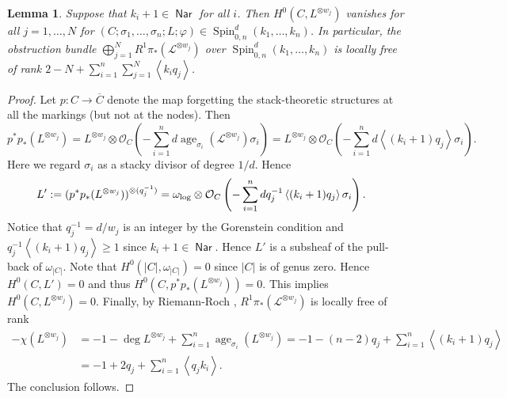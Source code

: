 \documentclass[11pt]{amsart}
\newtheorem{lem}[thm]{Lemma} %
\theoremstyle{definition} %
\theoremstyle{remark} %
\newcommand{\ZZ}{\mathbb Z}
\newcommand{\age}{\operatorname{age}}
\def\ol{\overline}
\def\fracp#1{\left\langle #1 \right\rangle}
\newcommand{\cO}{\mathcal{O}}
\newcommand{\cL}{\mathcal{L}}
\newcommand{\Nar}{\operatorname{\mathsf{Nar}}}
\newcommand{\Spin}{\operatorname{Spin}}
\begin{document}
\begin{lem} \label{lem:concave}
Suppose that $k_i+1 \in \Nar$ for all $i$.
Then $H^0(C,L^{\otimes w_j})$ vanishes for all $j=1,\dots, N$ for  
$(C;\sigma_1,\dots,\sigma_n;L;\varphi)\in 
\Spin^d_{0,n}(k_1,\dots,k_n)$. 
In particular, the obstruction bundle  
$\bigoplus_{j=1}^N R^1\pi_* (\cL^{\otimes w_j})$ 
over $\Spin^d_{0,n}(k_1,\dots,k_n)$ 
is locally free of rank $2 - N + \sum_{i=1}^n \sum_{j=1}^N \fracp{k_i q_j}$. 
\end{lem} 
\begin{proof} 
Let $p\colon C \to \ol{C}$ denote the map forgetting the 
stack-theoretic structures at all the markings 
(but not at the nodes). 
Then 
\[
p^* p_* (L^{\otimes w_j}) = L^{\otimes w_j} \otimes 
\cO_C\left( - \sum_{i=1}^n 
d \age_{\sigma_i} (\cL^{\otimes w_j}) \sigma_i \right) 
= L^{\otimes w_j}\otimes \cO_C\left(
- \sum_{i=1}^n d \fracp{(k_i+1) q_j} \sigma_i \right). 
\]  
Here we regard $\sigma_i$ as a stacky divisor of degree $1/d$. 
Hence 
\begin{align*} 
L' := (p^* p_* (L^{\otimes w_j}))^{\otimes (q_j^{-1})}  
& = \omega_{\rm \log}\otimes \cO_C\left(
-\sum_{i=1}^n d q_j^{-1} \fracp{(k_i+1) q_j}\sigma_i 
\right). 
\end{align*} 
Notice that $q_j^{-1} = d/w_j$ is an integer by the Gorenstein condition 
and $q_j^{-1} \fracp{(k_i+1) q_j} \ge 1$ since $k_i+1 \in \Nar$. 
Hence $L'$ is a subsheaf of the pull-back of $\omega_{|C|}$. 
Note that $H^0(|C|,\omega_{|C|})=0$ since $|C|$ is of genus zero. 
Hence $H^0(C, L')=0$ 
and thus $H^0(C,p^* p_* (L^{\otimes w_j})) =0$. 
This implies $H^0(C, L^{\otimes w_j}) =0$. 
Finally, by Riemann-Roch \cite{AGV, Kawasaki, Toen}, 
$R^1 \pi_* (\cL^{\otimes w_j})$ is locally free of rank 
\begin{align*} 
-\chi(L^{\otimes w_j}) & = 
-1 - \deg L^{\otimes w_j} + \sum_{i=1}^n \age_{\sigma_i}(L^{\otimes w_j}) 
=  
-1 - (n-2)q_j + \sum_{i=1}^n  \fracp{(k_i+1)q_j} \\ 
& = -1 + 2 q_j + \sum_{i=1}^n \fracp{q_j k_i}. 
\end{align*} 
The conclusion follows. 
\end{proof}
\end{document}
